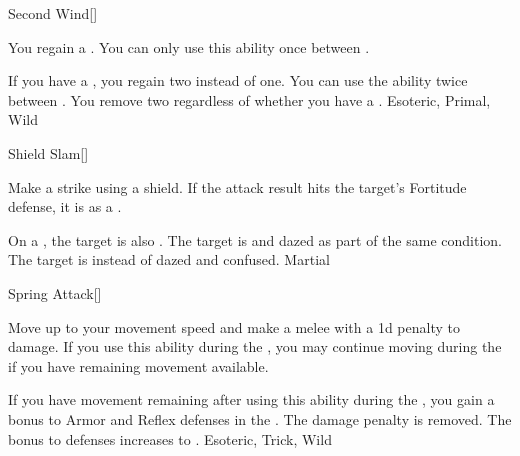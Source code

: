 \lowercase{\hypertarget{maneuver:Second Wind}{}}\label{maneuver:Second Wind}
\hypertarget{maneuver:Second Wind}{}
\begin{freeability}[Rank 1]{Second Wind}[]

You regain a .
You can only use this ability once between .

\rankline
{} If you have a , you regain two  instead of one.
 You can use the ability twice between .
 You remove two  regardless of whether you have a .
 Esoteric, Primal, Wild
\end{freeability}
\vspace{0.25em}



\lowercase{\hypertarget{maneuver:Shield Slam}{}}\label{maneuver:Shield Slam}
\hypertarget{maneuver:Shield Slam}{}
\begin{freeability}[Rank 1]{Shield Slam}[]

Make a strike using a shield.
If the attack result hits the target's Fortitude defense,
it is  as a .

\rankline
{} On a , the target is also .
 The target is  and dazed as part of the same condition.
 The target is  instead of dazed and confused.
 Martial
\end{freeability}
\vspace{0.25em}



\lowercase{\hypertarget{maneuver:Spring Attack}{}}\label{maneuver:Spring Attack}
\hypertarget{maneuver:Spring Attack}{}
\begin{freeability}[Rank 1]{Spring Attack}[]

Move up to your movement speed and make a melee  with a \minus1d penalty to damage.
If you use this ability during the , you may continue moving during the  if you have remaining movement available.

\rankline
{} If you have movement remaining after using this ability during the ,
you gain a  bonus to Armor and Reflex defenses in the .
 The damage penalty is removed.
 The bonus to defenses increases to .
 Esoteric, Trick, Wild
\end{freeability}
\vspace{0.25em}



